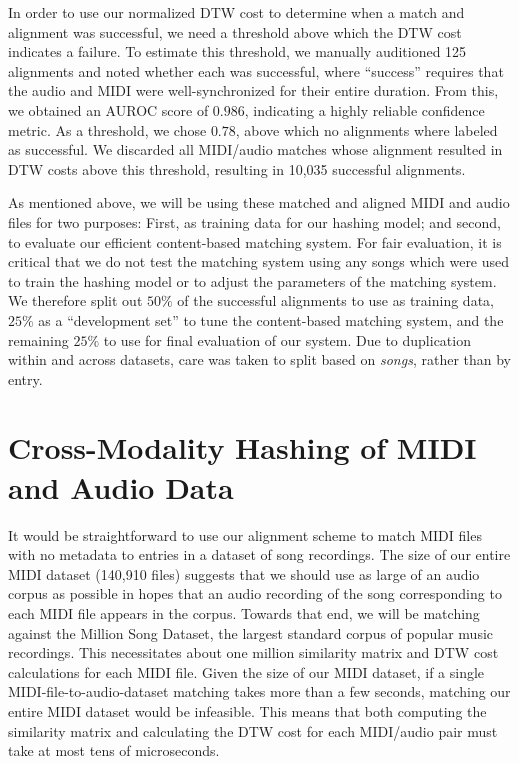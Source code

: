 \documentclass{article}
\begin{document}
In order to use our normalized DTW cost to determine when a match and alignment was successful, we need a threshold above which the DTW cost indicates a failure.
To estimate this threshold, we manually auditioned 125 alignments and noted whether each was successful, where ``success'' requires that the audio and MIDI were well-synchronized for their entire duration.
From this, we obtained an AUROC score of $0.986$, indicating a highly reliable confidence metric.
As a threshold, we chose $0.78$, above which no alignments where labeled as successful.
We discarded all MIDI/audio matches whose alignment resulted in DTW costs above this threshold, resulting in 10,035 successful alignments.

As mentioned above, we will be using these matched and aligned MIDI and audio files for two purposes: First, as training data for our hashing model; and second, to evaluate our efficient content-based matching system.
For fair evaluation, it is critical that we do not test the matching system using any songs which were used to train the hashing model or to adjust the parameters of the matching system.
We therefore split out $50\%$ of the successful alignments to use as training data, $25\%$ as a ``development set'' to tune the content-based matching system, and the remaining $25\%$ to use for final evaluation of our system.
Due to duplication within and across datasets, care was taken to split based on \textit{songs}, rather than by entry.

\section{Cross-Modality Hashing of MIDI and Audio Data}
\label{sec:hashing}

It would be straightforward to use our alignment scheme to match MIDI files with no metadata to entries in a dataset of song recordings.
The size of our entire MIDI dataset (140,910 files) suggests that we should use as large of an audio corpus as possible in hopes that an audio recording of the song corresponding to each MIDI file appears in the corpus.
Towards that end, we will be matching against the Million Song Dataset, the largest standard corpus of popular music recordings.
This necessitates about one million similarity matrix and DTW cost calculations for each MIDI file.
Given the size of our MIDI dataset, if a single MIDI-file-to-audio-dataset matching takes more than a few seconds, matching our entire MIDI dataset would be infeasible.
This means that both computing the similarity matrix and calculating the DTW cost for each MIDI/audio pair must take at most tens of microseconds.
\end{document}
